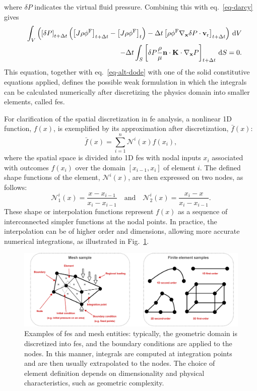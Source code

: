 %
where $\delta P$ indicates the virtual fluid pressure. Combining this with eq.~\ref{eq-darcy} gives
%
\begin{eqnarray}\label{eq-fluid-2}
    & & \int_V \left( \left[ \delta P \right]_{t+\Delta t} \left( \left[ J \rho \phi^{\rm F} \right]_{t+\Delta t} - \left[ J \rho \phi^{\rm F} \right]_{t} \right) - \Delta t \left[ \rho \phi^{\rm F} \nabla_{\mathbf{x}} \delta P \cdot \mathbf{v}_{\rm r} \right]_{t+\Delta t} \right) \, \mathrm{d}V \nonumber \\
    & & - \Delta t \int_S \left[ \delta P \frac{\rho}{\mu } \mathbf{n} \cdot \mathbf{K} \cdot \nabla_\mathbf{x} P \right]_{t+\Delta t} \, \mathrm{d}S = 0.
\end{eqnarray}
%
This equation, together with eq.~\ref{eq-alt-dode} with one of the solid constitutive equations applied, defines the possible weak formulation in which the integrals can be calculated numerically after discretizing the physics domain into smaller elements, called \ac{fe}s.

For clarification of the spatial discretization in \ac{fe} analysis, a nonlinear 1D function, \( f(x) \), is exemplified by its approximation after discretization, \( \bar{f}(x) \):
%
\begin{equation}\label{eq-alt-shape}
    \bar{f}(x) = \sum_{i=1}^{n} \mathcal{N}^{i}(x) f(x_i),
\end{equation}
%
where the spatial space is divided into 1D \ac{fe}s with nodal inputs \( x_i \) associated with outcomes \( f(x_i) \) over the domain \( [x_{i-1}, x_i] \) of element $i$. The defined shape functions of the element, \( \mathcal{N}^i(x) \), are then expressed on two nodes, as follows:
%
\begin{equation}
    \mathcal{N}_1^{i}(x) = \frac{x - x_{i-1}}{x_i - x_{i-1}} 
    \quad \text{and} \quad 
    \mathcal{N}_2^{i}(x) = \frac{x_i - x}{x_i - x_{i-1}}.
\end{equation}
%
These shape or interpolation functions represent \( f(x) \) as a sequence of interconnected simpler functions at the nodal points. In practice, the interpolation can be of higher order and dimensions, allowing more accurate numerical integrations, as illustrated in Fig.~\ref{fea}.
%
\begin{figure}
\includegraphics[width=1\linewidth]{fea.png}
\caption{Examples of \acp{fe} and mesh entities: typically, the geometric domain is discretized into \acp{fe}, and the boundary conditions are applied to the nodes. In this manner, integrals are computed at integration points and are then usually extrapolated to the nodes. The choice of element definition depends on dimensionality and physical characteristics, such as geometric complexity.}
\label{fea}
\end{figure}

